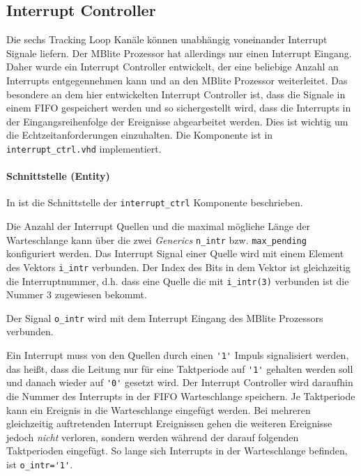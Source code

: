 \subsection{Interrupt Controller}
Die sechs Tracking Loop Kanäle können unabhängig voneinander Interrupt Signale liefern. Der MBlite Prozessor hat allerdings nur einen Interrupt Eingang. Daher wurde ein Interrupt Controller entwickelt, der eine beliebige Anzahl an Interrupts entgegennehmen kann und an den MBlite Prozessor weiterleitet. Das besondere an dem hier entwickelten Interrupt Controller ist, dass die Signale in einem FIFO gespeichert werden und so sichergestellt wird, dass die Interrupts in der Eingangsreihenfolge der Ereignisse abgearbeitet werden. Dies ist wichtig um die Echtzeitanforderungen einzuhalten. Die Komponente ist in \lstinline$interrupt_ctrl.vhd$ implementiert. 


\paragraph{Schnittstelle (Entity)}
In  ist die Schnittstelle der \lstinline$interrupt_ctrl$ Komponente beschrieben.

Die Anzahl der Interrupt Quellen und die maximal mögliche Länge der Warteschlange kann über die zwei \emph{Generics} \lstinline$n_intr$ bzw. \lstinline$max_pending$ konfiguriert werden. Das Interrupt Signal einer Quelle wird mit einem Element des Vektors \lstinline$i_intr$ verbunden. Der Index des Bits in dem Vektor ist gleichzeitig die Interruptnummer, d.h. dass eine Quelle die mit \lstinline$i_intr(3)$ verbunden ist die Nummer 3 zugewiesen bekommt.

Der Signal \lstinline$o_intr$ wird mit dem Interrupt Eingang des MBlite Prozessors verbunden. 

Ein Interrupt muss von den Quellen durch einen  \lstinline$'1'$ Impuls signalisiert werden, das heißt, dass die Leitung nur für eine Taktperiode auf  \lstinline$'1'$ gehalten werden soll und danach wieder auf  \lstinline$'0'$ gesetzt wird. Der Interrupt Controller wird daraufhin die Nummer des Interrupts in der FIFO Warteschlange speichern. Je Taktperiode kann ein Ereignis in die Warteschlange eingefügt werden. Bei mehreren gleichzeitig auftretenden Interrupt Ereignissen gehen die weiteren Ereignisse jedoch \emph{nicht} verloren, sondern werden während der darauf folgenden Taktperioden eingefügt. So lange sich Interrupts in der Warteschlange befinden, ist \lstinline$o_intr='1'$. 

